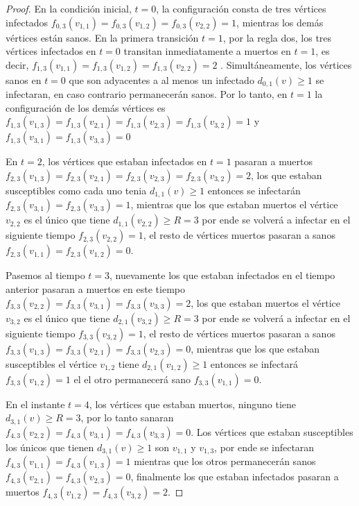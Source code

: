 \documentclass[12pt,titlepage,twoside,openright]{book}
\begin{document}
\begin{proof}
    En la condici\'on inicial, $t=0$, la configuraci\'on consta de tres v\'ertices infectados $f_{0,3}(v_{1,1})=f_{0,3}(v_{1,2})=f_{0,3}(v_{2,2})=1$, mientras los dem\'as v\'ertices est\'an sanos. En la primera transici\'on $t=1$, por la regla dos, los tres v\'ertices infectados en $t=0$ transitan inmediatamente a muertos en $t=1$, es decir, $f_{1,3}(v_{1,1})=f_{1,3}(v_{1,2})=f_{1,3}(v_{2,2})=2$ . Simult\'aneamente, los v\'ertices sanos en $t=0$ que son adyacentes a al menos un infectado $d_{0,1}(v)\geq 1$ se infectaran, en caso contrario permanecer\'an sanos. Por lo tanto, en $t=1$ la configuraci\'on de los dem\'as v\'ertices es $f_{1,3}(v_{1,3})=f_{1,3}(v_{2,1})=f_{1,3}(v_{2,3})=f_{1,3}(v_{3,2})=1$ y $f_{1,3}(v_{3,1})=f_{1,3}(v_{3,3})=0$

    En $t=2$, los v\'ertices que estaban infectados en $t=1$ pasaran a muertos $f_{2,3}(v_{1,3})=f_{2,3}(v_{2,1})=f_{2,3}(v_{2,3})=f_{2,3}(v_{3,2})=2$, los que estaban susceptibles como cada uno tenia $d_{1,1}(v)\geq 1$ entonces se infectar\'an $f_{2,3}(v_{3,1})=f_{2,3}(v_{3,3})=1$, mientras que los que estaban muertos el v\'ertice $v_{2,2}$ es el \'unico que tiene $d_{1,1}(v_{2,2})\geq R=3$ por ende se volver\'a a infectar en el siguiente tiempo $f_{2,3}(v_{2,2})=1$, el resto de v\'ertices muertos pasaran a sanos $f_{2,3}(v_{1,1})=f_{2,3}(v_{1,2})=0$. 

    Pasemos al tiempo $t=3$, nuevamente los que estaban infectados en el tiempo anterior pasaran a muertos en este tiempo $f_{3,3}(v_{2,2})=f_{3,3}(v_{3,1})=f_{3,3}(v_{3,3})=2$, los que estaban muertos el v\'ertice $v_{3,2}$ es el \'unico que tiene $d_{2,1}(v_{3,2})\geq R=3$ por ende se volver\'a a infectar en el siguiente tiempo $f_{3,3}(v_{3,2})=1$, el resto de v\'ertices muertos pasaran a sanos $f_{3,3}(v_{1,3})=f_{3,3}(v_{2,1})=f_{3,3}(v_{2,3})=0$, mientras que los que estaban susceptibles el v\'ertice $v_{1,2}$ tiene $d_{2,1}(v_{1,2})\geq 1$ entonces se infectar\'a $f_{3,3}(v_{1,2})=1$ el el otro permanecer\'a sano $f_{3,3}(v_{1,1})=0$.

    En el instante $t=4$, los v\'ertices que estaban muertos, ninguno tiene $d_{3,1}(v)\geq R=3$, por lo tanto sanaran $f_{4,3}(v_{2,2})=f_{4,3}(v_{3,1})=f_{4,3}(v_{3,3})=0$. Los v\'ertices que estaban susceptibles los \'unicos que tienen $d_{3,1}(v)\geq 1$ son $v_{1,1}$ y $v_{1,3}$, por ende se infectaran $f_{4,3}(v_{1,1})=f_{4,3}(v_{1,3})=1$ mientras que los otros permanecer\'an sanos $f_{4,3}(v_{2,1})=f_{4,3}(v_{2,3})=0$, finalmente los que estaban infectados pasaran a muertos $f_{4,3}(v_{1,2})=f_{4,3}(v_{3,2})=2$.


\end{proof}
\end{document}
